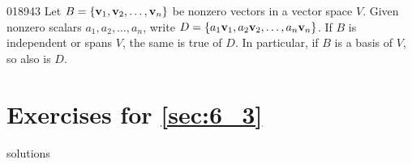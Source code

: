 \begin{example}{}{018943}
Let $B = \{\textbf{v}_{1}, \textbf{v}_{2}, \dots, \textbf{v}_{n}\}$ be nonzero vectors in a vector space $V$. Given nonzero scalars $a_{1}, a_{2}, \dots, a_{n}$, write $D = \{a_{1}\textbf{v}_{1}, a_{2}\textbf{v}_{2}, \dots, a_{n}\textbf{v}_{n}\}$. If $B$ is independent or spans $V$, the same is true of $D$. In particular, if $B$ is a basis of $V$, so also is $D$.
\end{example}

\section*{Exercises for \ref{sec:6_3}}

\begin{Filesave}{solutions}
\end{Filesave}


